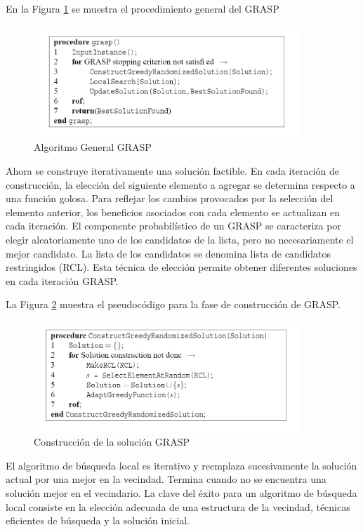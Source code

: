 \documentclass[a4paper,openright,11pt,oneside]{book}
\begin{document}
		En la Figura \ref{GRASPgeneral} se muestra el procedimiento general del GRASP
		
		\begin{figure}[h]
			\centering
			\includegraphics[width=10cm]{./Graphics/GRASPgeneral.png}
			\caption{Algoritmo General GRASP}
			\label{GRASPgeneral}
		\end{figure}
		
		Ahora se construye iterativamente una solución factible. En cada iteración de construcción, la elección del siguiente elemento a agregar se determina respecto a una función golosa. Para reflejar los cambios provocados por la selección del elemento anterior, los beneficios asociados con cada elemento se actualizan en cada iteración. El componente probabilístico de un GRASP se caracteriza por elegir aleatoriamente uno de los candidatos de la lista, pero no necesariamente el mejor candidato. La lista de los candidatos se denomina lista de candidatos restringidos (RCL). Esta técnica de elección permite obtener diferentes soluciones en cada iteración GRASP.
		
		La Figura \ref{GRASPconstructionphase} muestra el pseudocódigo para la fase de construcción de GRASP.
	
		\begin{figure}[h]
			\centering
			\includegraphics[width=10cm]{./Graphics/GRASPconstructionphase.png}
			\caption{Construcción de la solución GRASP}
			\label{GRASPconstructionphase}
		\end{figure}
	
		El algoritmo de búsqueda local es iterativo y reemplaza sucesivamente la solución actual por una mejor en la vecindad. Termina cuando no se encuentra una solución mejor en el vecindario. La clave del éxito para un algoritmo de búsqueda local consiste en la elección adecuada de una estructura de la vecindad, técnicas eficientes de búsqueda y la solución inicial.
		
\end{document}
